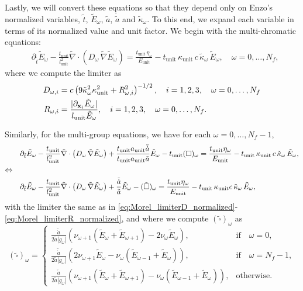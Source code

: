 \documentclass[10pt]{article}
\renewcommand{\(}{\left(}
\renewcommand{\)}{\right)}
\newcommand{\xvec}{{\bf x}}
\newcommand{\adot}{\dot{a}}
\newcommand{\Aunit}{a_{\text{unit}}}
\newcommand{\Lunit}{l_{\text{unit}}}
\newcommand{\Tunit}{t_{\text{unit}}}
\newcommand{\Eunit}{E_{\text{unit}}}
\newcommand{\Kunit}{\kappa_{\text{unit}}}
\newcommand{\tK}{\tilde{\kappa}}
\newcommand{\tT}{\tilde{t}}
\newcommand{\tE}{\tilde{E}}
\newcommand{\tA}{\tilde{a}}
\newcommand{\tAdot}{\tilde{\adot}}
\newcommand{\tnabla}{\tilde{\nabla}}
\begin{document}
Lastly, we will convert these equations so that they depend only on
Enzo's normalized variables, $\tT$, $\tE_{\omega}$, $\tA$, $\dot{\tA}$ and
$\tK_{\omega}$.  To this end, we expand each variable in terms of its
normalized value and unit factor.  We begin with the multi-chromatic
equations: 
\begin{align}
  \label{eq:mgfld_multichromatic_comoving_normalized}
  &\partial_{\tT} \tE_{\omega} - \frac{\Tunit}{\Lunit^2}\tnabla\cdot\(D_{\omega}\,\tnabla \tE_{\omega}\)
    = \frac{\Tunit\,\eta_{\omega}}{\Eunit} - \Tunit\, \Kunit\, c\, \tK_{\omega}\, \tE_{\omega}, \quad
    \omega=0,\ldots,N_f,
\end{align}
where we compute the limiter as
\begin{align}
  \label{eq:Morel_limiterD_normalized}
  D_{\omega,i} &= c \left(9\tK_{\omega}^2\Kunit^2 +
  R_{\omega,i}^2\right)^{-1/2}, \quad i=1,2,3,\quad \omega=0,\ldots,N_f\\
  \label{eq:Morel_limiterR_normalized}
  R_{\omega,i} &= \frac{|\partial_{\xvec_i}\tE_{\omega}|}{\Lunit \tE_{\omega}}, \quad i=1,2,3,\quad \omega=0,\ldots,N_f.
\end{align}


Similarly, for the multi-group equations, we have for each $\omega=0,\ldots,N_f-1$,
\begin{align}
  \notag
  &\partial_{\tT} \tE_{\omega} - \frac{\Tunit}{\Lunit^2}\tnabla\cdot\(D_{\omega}\,\tnabla \tE_{\omega}\)
    + \frac{\Tunit \Aunit\tAdot}{\Tunit \Aunit\tA} \tE_{\omega} - \Tunit(\square)_{\omega} = 
    \frac{\Tunit\eta_{\omega}}{\Eunit} - \Tunit\, \Kunit\, c\, \tK_{\omega}\, \tE_{\omega},\\
  \Leftrightarrow \quad & \\
  \label{eq:mgfld_multigroup_comoving_normalized}
  &\partial_{\tT} \tE_{\omega} - \frac{\Tunit}{\Lunit^2}\tnabla\cdot\(D_{\omega}\,\tnabla \tE_{\omega}\)
    + \frac{\tAdot}{\tA} \tE_{\omega} - (\tilde{\square})_{\omega} = 
    \frac{\Tunit\eta_{\omega}}{\Eunit} - \Tunit\, \Kunit c\, \tK_{\omega}\, \tE_{\omega},
\end{align}
with the limiter the same as in
\eqref{eq:Morel_limiterD_normalized}-\eqref{eq:Morel_limiterR_normalized},
and where we compute $(\tilde{\square})_{\omega}$ as
\begin{equation}
\label{eq:square_omega_normalized}
  (\tilde{\square})_{\omega} = \begin{cases}
    \frac{\tAdot}{2\tA|g_{\omega}|}\left(
      \nu_{\omega+1} (\tE_{\omega}+\tE_{\omega+1}) - 2\nu_{\omega} \tE_{\omega}\right),&
      \text{if}\quad \omega=0,\\
    \frac{\tAdot}{2\tA|g_{\omega}|}\left(
      2\nu_{\omega+1} \tE_{\omega} - \nu_{\omega} (\tE_{\omega-1}+\tE_{\omega})\right),&
      \text{if}\quad \omega=N_f-1,\\
    \frac{\tAdot}{2\tA|g_{\omega}|}\left(
      \nu_{\omega+1} (\tE_{\omega}+\tE_{\omega+1}) - \nu_{\omega}(\tE_{\omega-1}+\tE_{\omega})\right),& 
      \text{otherwise}.
  \end{cases}
\end{equation}
\end{document}
